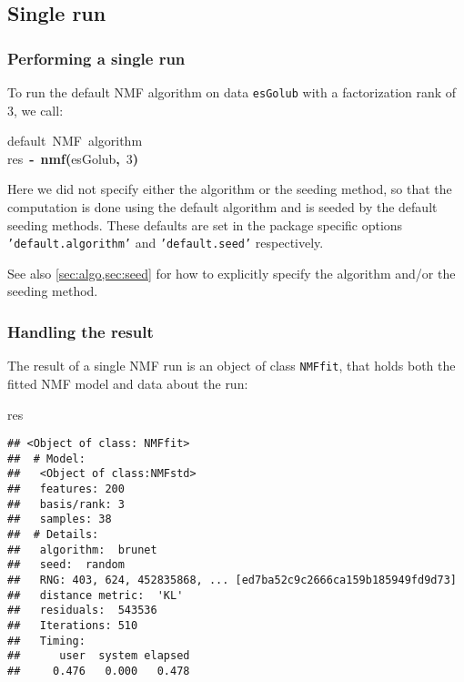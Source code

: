 \documentclass[a4paper]{article}\usepackage{graphicx, color}
\makeatletter
\newcommand{\hlnumber}[1]{\textcolor[rgb]{0,0,0}{#1}}%
\newcommand{\hlfunctioncall}[1]{\textcolor[rgb]{0.501960784313725,0,0.329411764705882}{\textbf{#1}}}%
\newcommand{\hlkeyword}[1]{\textcolor[rgb]{0,0,0}{\textbf{#1}}}%
\newcommand{\hlcomment}[1]{\textcolor[rgb]{0.180392156862745,0.6,0.341176470588235}{#1}}%
\newcommand{\hlassignement}[1]{\textcolor[rgb]{0,0,0}{\textbf{#1}}}%
\newcommand{\hlsymbol}[1]{\textcolor[rgb]{0,0,0}{#1}}%
\newcommand{\hlstd}[1]{\textcolor[rgb]{0,0,0}{#1}}%
\newenvironment{kframe}{%
 \def\FrameCommand##1{\hskip\@totalleftmargin \hskip-\fboxsep
 \colorbox{shadecolor}{##1}\hskip-\fboxsep
     \hskip-\linewidth \hskip-\@totalleftmargin \hskip\columnwidth}%
 \MakeFramed {\advance\hsize-\width
   \@totalleftmargin\z@ \linewidth\hsize
   \@setminipage}}%
 {\par\unskip\endMakeFramed}
\newenvironment{knitrout}{}{} %
\let\code=\texttt
\makeatother
\begin{document}
\subsection{Single run}\label{sec:single_run}

\subsubsection{Performing a single run}
To run the default NMF algorithm on data \code{esGolub} with a factorization rank of 3, we call: 

\begin{knitrout}
\color{fgcolor}\begin{kframe}
\begin{flushleft}
\ttfamily\noindent
\hlcomment{\usebox{\hlnormalsizeboxhash}{\ }default{\ }NMF{\ }algorithm}\hspace*{\fill}\\
\hlstd{}\hlsymbol{res}{\ }\hlassignement{\usebox{\hlnormalsizeboxlessthan}-}{\ }\hlfunctioncall{nmf}\hlkeyword{(}\hlsymbol{esGolub}\hlkeyword{,}{\ }\hlnumber{3}\hlkeyword{)}\mbox{}
\normalfont
\end{flushleft}
\end{kframe}
\end{knitrout}


Here we did not specify either the algorithm or the seeding method, so that the computation is done using the default algorithm and is seeded by the 
default seeding methods.
These defaults are set in the package specific options \code{'default.algorithm'} 
and \code{'default.seed'} respectively.

See also \cref{sec:algo,sec:seed} for how to explicitly specify the algorithm and/or the seeding method.

\subsubsection{Handling the result}

The result of a single NMF run is an object of class \code{NMFfit}, that holds both the fitted NMF model and data about the run:

\begin{knitrout}
\color{fgcolor}\begin{kframe}
\begin{flushleft}
\ttfamily\noindent
\hlsymbol{res}\mbox{}
\normalfont
\end{flushleft}
\begin{verbatim}
## <Object of class: NMFfit>
##  # Model:
##   <Object of class:NMFstd>
##   features: 200 
##   basis/rank: 3 
##   samples: 38 
##  # Details:
##   algorithm:  brunet 
##   seed:  random 
##   RNG: 403, 624, 452835868, ... [ed7ba52c9c2666ca159b185949fd9d73]
##   distance metric:  'KL' 
##   residuals:  543536 
##   Iterations: 510 
##   Timing:
##      user  system elapsed 
##     0.476   0.000   0.478 
\end{verbatim}
\end{kframe}
\end{knitrout}
\end{document}
